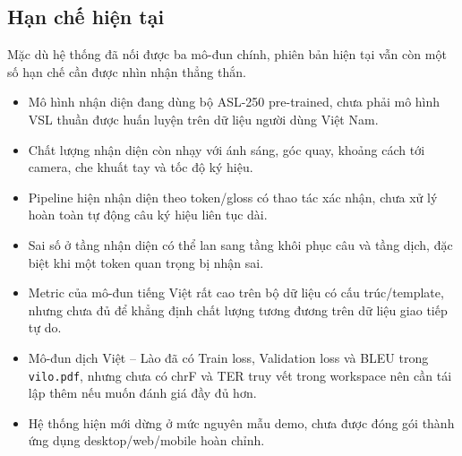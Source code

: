 ﻿\subsection{Hạn chế hiện tại}

Mặc dù hệ thống đã nối được ba mô-đun chính, phiên bản hiện tại vẫn còn một số hạn chế cần được nhìn nhận thẳng thắn.

\begin{itemize}
    \item Mô hình nhận diện đang dùng bộ ASL-250 pre-trained, chưa phải mô hình VSL thuần được huấn luyện trên dữ liệu người dùng Việt Nam.
    \item Chất lượng nhận diện còn nhạy với ánh sáng, góc quay, khoảng cách tới camera, che khuất tay và tốc độ ký hiệu.
    \item Pipeline hiện nhận diện theo token/gloss có thao tác xác nhận, chưa xử lý hoàn toàn tự động câu ký hiệu liên tục dài.
    \item Sai số ở tầng nhận diện có thể lan sang tầng khôi phục câu và tầng dịch, đặc biệt khi một token quan trọng bị nhận sai.
    \item Metric của mô-đun tiếng Việt rất cao trên bộ dữ liệu có cấu trúc/template, nhưng chưa đủ để khẳng định chất lượng tương đương trên dữ liệu giao tiếp tự do.
    \item Mô-đun dịch Việt -- Lào đã có Train loss, Validation loss và BLEU trong \texttt{vilo.pdf}, nhưng chưa có chrF và TER truy vết trong workspace nên cần tái lập thêm nếu muốn đánh giá đầy đủ hơn.
    \item Hệ thống hiện mới dừng ở mức nguyên mẫu demo, chưa được đóng gói thành ứng dụng desktop/web/mobile hoàn chỉnh.
\end{itemize}

